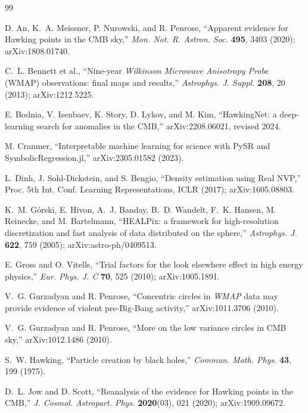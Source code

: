 \documentclass[11pt,a4paper]{article}
\begin{document}
\begin{thebibliography}{99}

D. An, K.~A. Meissner, P. Nurowski, and R. Penrose,
``Apparent evidence for Hawking points in the CMB sky,''
\emph{Mon. Not. R. Astron. Soc.} \textbf{495}, 3403 (2020); arXiv:1808.01740.

C.~L. Bennett et al.,
``Nine-year \emph{Wilkinson Microwave Anisotropy Probe} (WMAP) observations: final maps and results,''
\emph{Astrophys. J. Suppl.} \textbf{208}, 20 (2013); arXiv:1212.5225.

E. Bodnia, V. Isenbaev, K. Story, D. Lykov, and M. Kim,
``HawkingNet: a deep-learning search for anomalies in the CMB,''
arXiv:2208.06021, revised 2024.

M. Cranmer,
``Interpretable machine learning for science with PySR and SymbolicRegression.jl,''
arXiv:2305.01582 (2023).

L. Dinh, J. Sohl-Dickstein, and S. Bengio,
``Density estimation using Real NVP,''
Proc. 5th Int. Conf. Learning Representations, ICLR (2017); arXiv:1605.08803.

K.~M. G\'orski, E. Hivon, A.~J. Banday, B.~D. Wandelt, F.~K. Hansen, M. Reinecke, and M. Bartelmann,
``HEALPix: a framework for high-resolution discretization and fast analysis of data distributed on the sphere,''
\emph{Astrophys. J.} \textbf{622}, 759 (2005); arXiv:astro-ph/0409513.

E. Gross and O. Vitells,
``Trial factors for the look elsewhere effect in high energy physics,''
\emph{Eur. Phys. J. C} \textbf{70}, 525 (2010); arXiv:1005.1891.

V.~G. Gurzadyan and R. Penrose,
``Concentric circles in \emph{WMAP} data may provide evidence of violent pre-Big-Bang activity,''
arXiv:1011.3706 (2010).

V.~G. Gurzadyan and R. Penrose,
``More on the low variance circles in CMB sky,''
arXiv:1012.1486 (2010).

S.~W. Hawking,
``Particle creation by black holes,''
\emph{Commun. Math. Phys.} \textbf{43}, 199 (1975).

D.~L. Jow and D. Scott,
``Reanalysis of the evidence for Hawking points in the CMB,''
\emph{J. Cosmol. Astropart. Phys.} \textbf{2020}(03), 021 (2020); arXiv:1909.09672.


\end{thebibliography}
\end{document}
